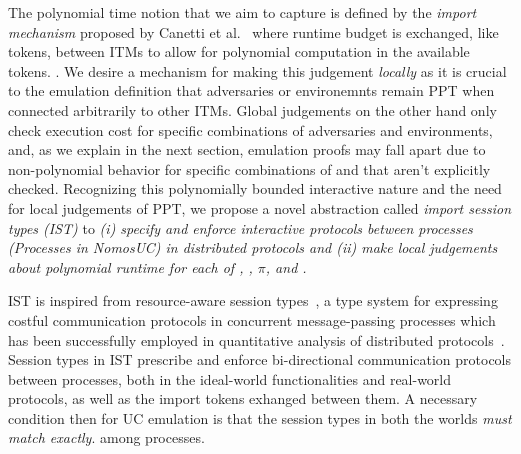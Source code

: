 The polynomial time notion that we aim to capture is defined by the \emph{import mechanism} proposed by Canetti et al.~\cite{uc} where runtime budget is exchanged, like tokens, between ITMs to allow for polynomial computation in the available tokens.
.
We desire a mechanism for making this judgement \emph{locally} as it is crucial to the emulation definition that adversaries or environemnts remain PPT when connected arbitrarily to other ITMs. 
Global judgements on the other hand only check execution cost for specific combinations of adversaries and environments, and, as we explain in the next section, emulation proofs may fall apart due to non-polynomial behavior for specific combinations of \Z and \A that aren't explicitly checked. 
Recognizing this polynomially bounded interactive nature and the need for local judgements of PPT, we propose a novel abstraction called \emph{import session types (IST)} to 
    \emph{(i) specify and enforce interactive protocols between processes (Processes in NomosUC) in distributed protocols and 
          (ii) make local judgements about polynomial runtime for each of \A, \F, $\pi$, and \Z.} 

IST is inspired from resource-aware session types~\cite{das2018work}, a type system for expressing costful communication protocols
in concurrent message-passing processes which has been successfully employed in quantitative analysis of distributed
protocols~\cite{dasnomos,Das20FSCD,Das22LMCS,Das20arxiv}.
Session types in IST prescribe and enforce bi-directional communication protocols between processes, both in the ideal-world functionalities and real-world protocols, as well as the import tokens exhanged between them.
A necessary condition then for UC emulation is that the session types in both the worlds \emph{must match exactly}.
among processes.

